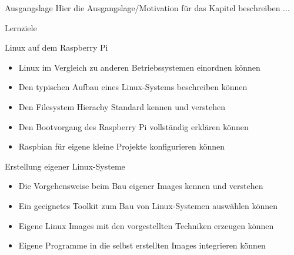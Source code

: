 \begin{frame}{Ausgangslage}
    Hier die Ausgangslage/Motivation für das Kapitel beschreiben ...

\end{frame}

\begin{frame}{Lernziele}
    \begin{block}{Linux auf dem Raspberry Pi}
        \begin{itemize}
            \item Linux im Vergleich zu anderen Betriebssystemen einordnen können
            \item Den typischen Aufbau eines Linux-Systems beschreiben können
            \item Den Filesystem Hierachy Standard kennen und verstehen
            \item Den Bootvorgang des Raspberry Pi vollständig erklären können
            \item Raspbian für eigene kleine Projekte konfigurieren können
        \end{itemize}
    \end{block}

    \begin{block}{Erstellung eigener Linux-Systeme}
        \begin{itemize}
            \item Die Vorgehensweise beim Bau eigener Images kennen und verstehen
            \item Ein geeignetes Toolkit zum Bau von Linux-Systemen auswählen können
            \item Eigene Linux Images mit den vorgestellten Techniken erzeugen können
            \item Eigene Programme in die selbst erstellten Images integrieren können
        \end{itemize}
    \end{block}
\end{frame}

